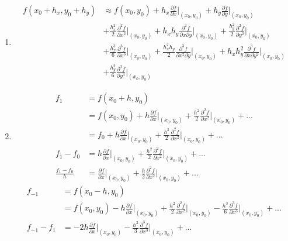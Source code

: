 \documentclass[12pt]{article}
\begin{document}
\begin{enumerate}
    \begin{enumerate}
        \item 
        \vspace{-10pt}
        \begin{align*}
            f(x_0+h_x, y_0+h_y) &\approx f(x_0, y_0) + h_x \frac{\partial f}{\partial x}\bigg|_{(x_0, y_0)} + h_y \frac{\partial f}{\partial y}\bigg|_{(x_0, y_0)} \\
            &+ \frac{h_x^2}{2} \frac{\partial^2 f}{\partial x^2}\bigg|_{(x_0, y_0)} + h_x h_y \frac{\partial^2 f}{\partial x \partial y}\bigg|_{(x_0, y_0)} + \frac{h_y^2}{2} \frac{\partial^2 f}{\partial y^2}\bigg|_{(x_0, y_0)} \\
            &+ \frac{h_x^3}{6} \frac{\partial^3 f}{\partial x^3}\bigg|_{(x_0, y_0)} + \frac{h_x^2 h_y}{2} \frac{\partial^3 f}{\partial x^2 \partial y}\bigg|_{(x_0, y_0)} + h_x h_y^2 \frac{\partial^3 f}{\partial x \partial y^2}\bigg|_{(x_0, y_0)}\\
            &+ \frac{h_y^3}{6} \frac{\partial^3 f}{\partial y^3}\bigg|_{(x_0, y_0)} 
        \end{align*}
        \item 
        \vspace{-10pt}
        \begin{align*}
            f_1&=f(x_0+h,y_0)\\
            &=f(x_0,y_0)+h\frac{\partial f}{\partial x}\bigg|_{(x_0,y_0)}+\frac{h^2}{2}\frac{\partial^2f}{\partial x^2}\bigg|_{(x_0,y_0)}+...\\
            &=f_0+h\frac{\partial f}{\partial x}\bigg|_{(x_0,y_0)}+\frac{h^2}{2}\frac{\partial^2f}{\partial x^2}\bigg|_{(x_0,y_0)}+...\\
            f_1-f_0&=h\frac{\partial f}{\partial x}\bigg|_{(x_0,y_0)}+\frac{h^2}{2}\frac{\partial^2f}{\partial x^2}\bigg|_{(x_0,y_0)}+...\\
            \frac{f_1-f_0}{h}&=\boxed{\frac{\partial f}{\partial x}\bigg|_{(x_0,y_0)}+\frac{h}{2}\frac{\partial^2f}{\partial x^2}\bigg|_{(x_0,y_0)}+...}
        \end{align*}
        \begin{align*}
            f_{-1}&=f(x_0-h,y_0)\\
            &=f(x_0,y_0)-h\frac{\partial f}{\partial x}\bigg|_{(x_0,y_0)}+\frac{h^2}{2}\frac{\partial^2 f}{\partial x^2}\bigg|_{(x_0,y_0)}-\frac{h^3}{6}\frac{\partial^3 f}{\partial x^3}\bigg|_{(x_0,y_0)}+...\\
            f_{-1}-f_1&=-2h\frac{\partial f}{\partial x}\bigg|_{(x_0,y_0)}-\frac{h^3}{3}\frac{\partial^3 f}{\partial x^3}\bigg|_{(x_0,y_0)}+...\\

\end{align*}
\end{enumerate}
\end{enumerate}
\end{document}
